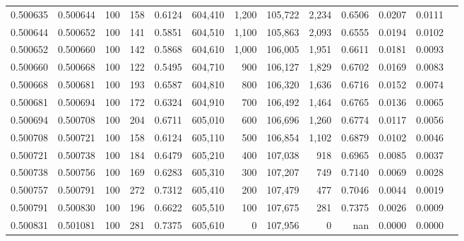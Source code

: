 \begin{tabular}{rrrrrrrrrrrrr}
0.500635 & 0.500644 &   100 & 158 &                                     0.6124 & 604,410 &   1,200 & 105,722 &   2,234 & 0.6506 & 0.0207 & 0.0111 \\
0.500644 & 0.500652 &   100 & 141 &                                     0.5851 & 604,510 &   1,100 & 105,863 &   2,093 & 0.6555 & 0.0194 & 0.0102 \\
0.500652 & 0.500660 &   100 & 142 &                                     0.5868 & 604,610 &   1,000 & 106,005 &   1,951 & 0.6611 & 0.0181 & 0.0093 \\
0.500660 & 0.500668 &   100 & 122 &                                     0.5495 & 604,710 &     900 & 106,127 &   1,829 & 0.6702 & 0.0169 & 0.0083 \\
0.500668 & 0.500681 &   100 & 193 &                                     0.6587 & 604,810 &     800 & 106,320 &   1,636 & 0.6716 & 0.0152 & 0.0074 \\
0.500681 & 0.500694 &   100 & 172 &                                     0.6324 & 604,910 &     700 & 106,492 &   1,464 & 0.6765 & 0.0136 & 0.0065 \\
0.500694 & 0.500708 &   100 & 204 &                                     0.6711 & 605,010 &     600 & 106,696 &   1,260 & 0.6774 & 0.0117 & 0.0056 \\
0.500708 & 0.500721 &   100 & 158 &                                     0.6124 & 605,110 &     500 & 106,854 &   1,102 & 0.6879 & 0.0102 & 0.0046 \\
0.500721 & 0.500738 &   100 & 184 &                                     0.6479 & 605,210 &     400 & 107,038 &     918 & 0.6965 & 0.0085 & 0.0037 \\
0.500738 & 0.500756 &   100 & 169 &                                     0.6283 & 605,310 &     300 & 107,207 &     749 & 0.7140 & 0.0069 & 0.0028 \\
0.500757 & 0.500791 &   100 & 272 &                                     0.7312 & 605,410 &     200 & 107,479 &     477 & 0.7046 & 0.0044 & 0.0019 \\
0.500791 & 0.500830 &   100 & 196 &                                     0.6622 & 605,510 &     100 & 107,675 &     281 & 0.7375 & 0.0026 & 0.0009 \\
0.500831 & 0.501081 &   100 & 281 &                                     0.7375 & 605,610 &       0 & 107,956 &       0 &    nan & 0.0000 & 0.0000 \\
\bottomrule
\end{tabular}
